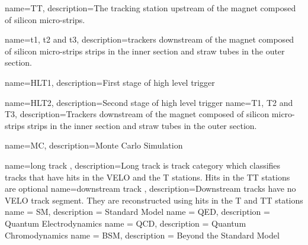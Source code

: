 {
	name=TT,
		description={The tracking station upstream of the magnet composed of silicon micro-strips.}
}


{
	name=t1{,} t2 and t3,
		description={trackers downstream of the magnet composed of silicon micro-strips strips in the inner section and straw tubes in the outer section.}
}

{
	name=HLT1,
		description={First stage of high level trigger}
}

{
	name=HLT2,
		description={Second stage of high level trigger}
}
{
	name=T1{,} T2 and T3,
		description={Trackers downstream of the magnet composed of silicon micro-strips strips in the inner section and straw tubes in the outer section.}
}

{
	name=MC,
		description={Monte Carlo Simulation}
}

{
	name=long track ,
		description={Long track is track category which classifies tracks that have hits in the VELO and the T stations. Hits in the TT stations are optional}
}
{
	name=downstream track ,
		description={Downstream tracks have no VELO track segment. They are reconstructed using hits in the T and TT stations}
}
{      
	name = SM,
	     description = {Standard Model}     
}
{      
	name = QED,
	     description = {Quantum Electrodynamics}     
}
{      
	name = QCD,
	     description = {Quantum Chromodynamics}     
}
{      
	name = BSM,
	     description = {Beyond the Standard Model}     
}
